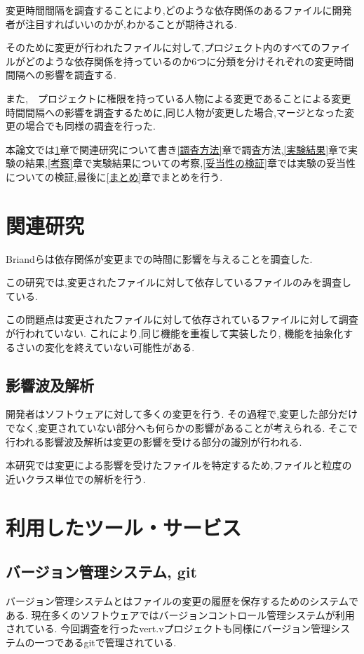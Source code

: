 \documentclass{fose2016}           %
\begin{document}
変更時間間隔を調査することにより,どのような依存関係のあるファイルに開発者が注目すればいいのかが,わかることが期待される.

そのために変更が行われたファイルに対して,プロジェクト内のすべてのファイルがどのような依存関係を持っているのか6つに分類を分けそれぞれの変更時間間隔への影響を調査する.

また,　プロジェクトに権限を持っている人物による変更であることによる変更時間間隔への影響を調査するために,同じ人物が変更した場合,マージとなった変更の場合でも同様の調査を行った.


本論文では\ref{関連研究}章で関連研究について書き\ref{調査方法}章で調査方法,\ref{実験結果}章で実験の結果,\ref{考察}章で実験結果についての考察,\ref{妥当性の検証}章では実験の妥当性についての検証,最後に\ref{まとめ}章でまとめを行う.


\section{関連研究}\label{関連研究}

Briand\cite{Briand}らは依存関係が変更までの時間に影響を与えることを調査した.

この研究では,変更されたファイルに対して依存しているファイルのみを調査している.

この問題点は変更されたファイルに対して依存されているファイルに対して調査が行われていない.
これにより,同じ機能を重複して実装したり, 機能を抽象化するさいの変化を終えていない可能性がある.


\subsection{影響波及解析}
開発者はソフトウェアに対して多くの変更を行う.
その過程で,変更した部分だけでなく,変更されていない部分へも何らかの影響があることが考えられる.
そこで行われる影響波及解析は変更の影響を受ける部分の識別が行われる.

本研究では変更による影響を受けたファイルを特定するため,ファイルと粒度の近いクラス単位での解析\cite{Ryder}を行う.

\section{利用したツール・サービス}
\subsection{バージョン管理システム, git}
バージョン管理システムとはファイルの変更の履歴を保存するためのシステムである.
現在多くのソフトウェアではバージョンコントロール管理システムが利用されている.
今回調査を行ったvert.vプロジェクトも同様にバージョン管理システムの一つであるgitで管理されている.
\end{document}

